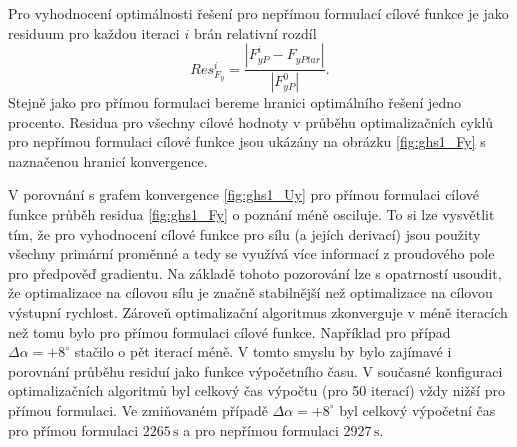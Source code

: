 Pro vyhodnocení optimálnosti řešení pro nepřímou formulací cílové funkce je jako residuum pro každou iteraci $ i $ brán relativní rozdíl
\begin{equation}\label{eq:res_fy}
Res_{F_{y}}^i=\dfrac{|F_{yP}^i-F_{yPtar}|}{|F_{yP}^0|}.
\end{equation}
Stejně jako pro přímou formulaci bereme hranici optimálního řešení jedno procento. Residua pro všechny cílové hodnoty v průběhu optimalizačních cyklů pro nepřímou formulaci cílové funkce jsou ukázány na obrázku \ref{fig:ghs1_Fy} s naznačenou hranicí konvergence. 

V porovnání s grafem konvergence \ref{fig:ghs1_Uy} pro přímou formulaci cílové funkce průběh residua \ref{fig:ghs1_Fy} o poznání méně osciluje. To si lze vysvětlit tím, že pro vyhodnocení cílové funkce pro sílu (a jejích derivací) jsou použity všechny primární proměnné a tedy se využívá více informací z proudového pole pro předpověď gradientu. Na základě tohoto pozorování lze s opatrností usoudit, že optimalizace na cílovou sílu je značně stabilnější než optimalizace na cílovou výstupní rychlost. Zároveň optimalizační algoritmus zkonverguje v méně iteracích než tomu bylo pro přímou formulaci cílové funkce. Například pro případ $ \Delta \alpha = +8^\circ $ stačilo o pět iterací méně. V tomto smyslu by bylo zajímavé i porovnání průběhu residuí jako funkce výpočetního času. V současné konfiguraci optimalizačních algoritmů byl celkový čas výpočtu (pro 50 iterací) vždy nižší pro přímou formulaci. Ve zmiňovaném případě $ \Delta \alpha = +8^\circ $ byl celkový výpočetní čas pro přímou formulaci $ 2265 \,\mathrm{s} $ a pro nepřímou formulaci $ 2927 \,\mathrm{s} $.


